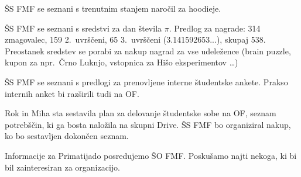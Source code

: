 \documentclass{seja}
\begin{document}
\begin{ad}
    \item
    ŠS FMF se seznani s trenutnim stanjem naročil za hoodieje.

    \item
    ŠS FMF se seznani s sredstvi za dan števila $\pi$. Predlog za nagrade: 314 zmagovalec, 159
    2.~uvrščeni, 65 3.~uvrščeni (3.141592653...), skupaj 538. Preostanek sredstev se porabi za nakup
    nagrad za vse udeležence (brain puzzle, kupon za npr.~Črno Luknjo, vstopnica za Hišo
    eksperimentov \ldots)

    \item
    ŠS FMF se seznani s predlogi za prenovljene interne študentske ankete. Prakso internih anket bi razširili tudi na OF.

    \item
    Rok in Miha sta sestavila plan za delovanje študentske sobe na OF, seznam potrebščin, ki ga bosta naložila na skupni Drive. ŠS FMF bo organiziral nakup, ko bo sestavljen dokončen seznam.

    Informacije za Primatijado posredujemo ŠO FMF. Poskušamo najti nekoga, ki bi bil zainteresiran za organizacijo.
\end{ad}
\end{document}
